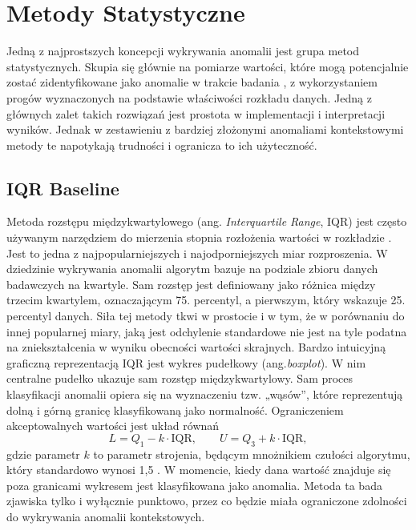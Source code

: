 \documentclass[a4paper,twoside,12pt]{book}
\newcommand{\obcy}[1]{\emph{#1}}
\newcommand{\english}[1]{{\selectlanguage{british}\obcy{#1}}}
\begin{document}
	\section{Metody Statystyczne}
	Jedną z najprostszych koncepcji wykrywania anomalii jest grupa metod statystycznych. Skupia się głównie na pomiarze wartości, które mogą potencjalnie zostać zidentyfikowane jako anomalie w trakcie badania \cite{lenart2024comparison}, z wykorzystaniem progów wyznaczonych na podstawie właściwości rozkładu danych. Jedną z głównych zalet takich rozwiązań jest prostota w implementacji i interpretacji wyników. Jednak w zestawieniu z bardziej złożonymi anomaliami kontekstowymi metody te napotykają trudności i ogranicza to ich użyteczność. 
	
	\subsection{IQR Baseline}
	Metoda rozstępu międzykwartylowego (ang. \english{Interquartile Range}, IQR) jest często używanym narzędziem do mierzenia stopnia rozłożenia wartości w rozkładzie \cite{kang2005q}. Jest to jedna z najpopularniejszych i najodporniejszych miar rozproszenia. W dziedzinie wykrywania anomalii algorytm bazuje na podziale zbioru danych badawczych na kwartyle. Sam rozstęp jest definiowany jako różnica między trzecim kwartylem, oznaczającym 75. percentyl, a pierwszym, który wskazuje 25. percentyl danych. Siła tej metody tkwi w prostocie i w tym, że w porównaniu do innej popularnej miary, jaką jest odchylenie standardowe nie jest na tyle podatna na zniekształcenia w wyniku obecności wartości skrajnych. 
	Bardzo intuicyjną graficzną reprezentacją IQR jest wykres pudełkowy  (ang.\english{boxplot}). W nim centralne pudełko ukazuje sam rozstęp międzykwartylowy. Sam proces klasyfikacji anomalii opiera się na wyznaczeniu tzw. „wąsów”, które reprezentują dolną i górną granicę klasyfikowaną jako normalność. Ograniczeniem akceptowalnych wartości jest układ równań
	\begin{equation}
		L = Q_1 - k \cdot \text{IQR}, \qquad
		U = Q_3 + k \cdot \text{IQR},
		\label{eq:iqr}
	\end{equation}
	 gdzie parametr $k$ to parametr strojenia, będącym mnożnikiem czułości algorytmu, który standardowo wynosi 1{,}5 \cite{migdadi2019robust}. W momencie, kiedy dana wartość znajduje się poza granicami wykresem jest klasyfikowana jako anomalia. Metoda ta bada zjawiska tylko i wyłącznie punktowo, przez co będzie miała ograniczone zdolności do wykrywania anomalii kontekstowych.
	
\end{document}
